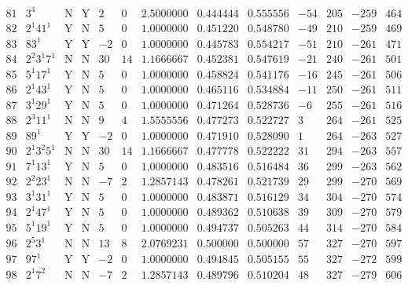 \documentclass[11pt,reqno,a4letter]{article}
\numberwithin{equation}{section}
\numberwithin{figure}{section}
\numberwithin{table}{section}
\theoremstyle{plain}
\numberwithin{theorem}{section}
\theoremstyle{definition}
\begin{document}
\begin{table}[ht]
\begin{equation*}
{\begin{array}{cc|cc|ccc|cc|cccc}
 81 & 3^4 & \text{N} & \text{Y} & 2 & 0 & 2.5000000 & 0.444444 & 0.555556 & -54 & 205 & -259 & 464 \\
 82 & 2^1 41^1 & \text{Y} & \text{N} & 5 & 0 & 1.0000000 & 0.451220 & 0.548780 & -49 & 210 & -259 & 469 \\
 83 & 83^1 & \text{Y} & \text{Y} & -2 & 0 & 1.0000000 & 0.445783 & 0.554217 & -51 & 210 & -261 & 471 \\
 84 & 2^2 3^1 7^1 & \text{N} & \text{N} & 30 & 14 & 1.1666667 & 0.452381 & 0.547619 & -21 & 240 & -261 & 501 \\
 85 & 5^1 17^1 & \text{Y} & \text{N} & 5 & 0 & 1.0000000 & 0.458824 & 0.541176 & -16 & 245 & -261 & 506 \\
 86 & 2^1 43^1 & \text{Y} & \text{N} & 5 & 0 & 1.0000000 & 0.465116 & 0.534884 & -11 & 250 & -261 & 511 \\
 87 & 3^1 29^1 & \text{Y} & \text{N} & 5 & 0 & 1.0000000 & 0.471264 & 0.528736 & -6 & 255 & -261 & 516 \\
 88 & 2^3 11^1 & \text{N} & \text{N} & 9 & 4 & 1.5555556 & 0.477273 & 0.522727 & 3 & 264 & -261 & 525 \\
 89 & 89^1 & \text{Y} & \text{Y} & -2 & 0 & 1.0000000 & 0.471910 & 0.528090 & 1 & 264 & -263 & 527 \\
 90 & 2^1 3^2 5^1 & \text{N} & \text{N} & 30 & 14 & 1.1666667 & 0.477778 & 0.522222 & 31 & 294 & -263 & 557 \\
 91 & 7^1 13^1 & \text{Y} & \text{N} & 5 & 0 & 1.0000000 & 0.483516 & 0.516484 & 36 & 299 & -263 & 562 \\
 92 & 2^2 23^1 & \text{N} & \text{N} & -7 & 2 & 1.2857143 & 0.478261 & 0.521739 & 29 & 299 & -270 & 569 \\
 93 & 3^1 31^1 & \text{Y} & \text{N} & 5 & 0 & 1.0000000 & 0.483871 & 0.516129 & 34 & 304 & -270 & 574 \\
 94 & 2^1 47^1 & \text{Y} & \text{N} & 5 & 0 & 1.0000000 & 0.489362 & 0.510638 & 39 & 309 & -270 & 579 \\
 95 & 5^1 19^1 & \text{Y} & \text{N} & 5 & 0 & 1.0000000 & 0.494737 & 0.505263 & 44 & 314 & -270 & 584 \\
 96 & 2^5 3^1 & \text{N} & \text{N} & 13 & 8 & 2.0769231 & 0.500000 & 0.500000 & 57 & 327 & -270 & 597 \\
 97 & 97^1 & \text{Y} & \text{Y} & -2 & 0 & 1.0000000 & 0.494845 & 0.505155 & 55 & 327 & -272 & 599 \\
 98 & 2^1 7^2 & \text{N} & \text{N} & -7 & 2 & 1.2857143 & 0.489796 & 0.510204 & 48 & 327 & -279 & 606 \\

\end{array}}
\end{equation*}
\end{table}
\end{document}
